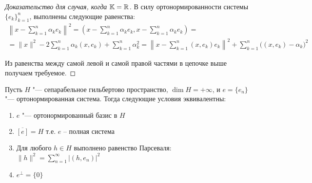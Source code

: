 \begin{proof}[Доказательство для случая, когда {$\mathbb{K} = \mathbb{R}$}]
	В силу ортонормированности системы $\{e_k\}_{k = 1}^n$, выполнены следующие равенства:
	\begin{multline*}
		\left\|x - \sum_{k = 1}^n \alpha_ke_k\right\|^2
		=
		\left(x - \sum_{k = 1}^n \alpha_ke_k, x - \sum_{k = 1}^n \alpha_ke_k\right)
		= 
		\\
		=
		\|x\|^2 - 2\sum_{k = 1}^n\alpha_k(x, e_k) + \sum_{k = 1}^n\alpha_k^2 = \left\|x - \sum_{k = 1}^n(x, e_k)e_k\right\|^2 + \sum_{k = 1}^n\big((x, e_k) - \alpha_k\big)^2
	\end{multline*}

	Из равенства между самой левой и самой правой частями в цепочке выше получаем требуемое.
\end{proof}

\begin{theorem}\label{thm4.4}
	Пусть $H$ "--- сепарабельное гильбертово пространство, $\dim{H} = +\infty$, и ${e = \{e_n\} }$ "--- ортонормированная система. Тогда следующие условия эквивалентны:
	\begin{enumerate}
		\item $e$ "--- ортонормированный базис в $H$
  		\item $\overline{[e]} = H$ т.е. $e$ -- полная система
    	\item Для любого $h \in H$ выполнено равенство Парсеваля: $\|h\|^2 = \sum \limits_{n = 1}^\infty |(h, e_n)|^2$
    	\item $e^\perp = \{0\}$
	\end{enumerate}
\end{theorem}

